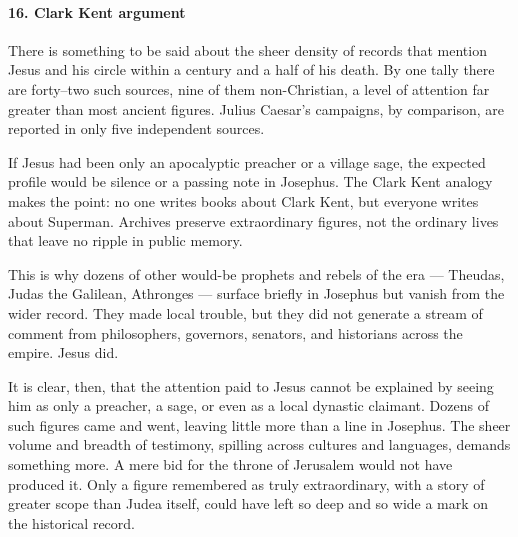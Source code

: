 \paragraph{16.
Clark Kent argument}\label{par:clark-kent-argument}

There is something to be said about the sheer density of records that mention Jesus and his circle within a century and a half of his death.
By one tally there are forty–two such sources, nine of them non-Christian, a level of attention far greater than most ancient figures.
Julius Caesar’s campaigns, by comparison, are reported in only five independent sources.

If Jesus had been only an apocalyptic preacher or a village sage, the expected profile would be silence or a passing note in Josephus.
The Clark Kent analogy makes the point: no one writes books about Clark Kent, but everyone writes about Superman.
Archives preserve extraordinary figures, not the ordinary lives that leave no ripple in public memory.

This is why dozens of other would-be prophets and rebels of the era — Theudas, Judas the Galilean, Athronges — surface briefly in Josephus but vanish from the wider record.
They made local trouble, but they did not generate a stream of comment from philosophers, governors, senators, and historians across the empire.
Jesus did.

It is clear, then, that the attention paid to Jesus cannot be explained by seeing him as only a preacher, a sage, or even as a local dynastic claimant.
Dozens of such figures came and went, leaving little more than a line in Josephus.
The sheer volume and breadth of testimony, spilling across cultures and languages, demands something more.
A mere bid for the throne of Jerusalem would not have produced it.
Only a figure remembered as truly extraordinary, with a story of greater scope than Judea itself, could have left so deep and so wide a mark on the historical record.
